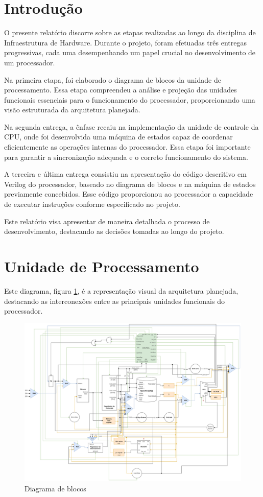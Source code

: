 \section{Introdução}

O presente relatório discorre sobre as etapas realizadas ao longo da disciplina de Infraestrutura de Hardware. Durante o projeto, foram efetuadas três entregas progressivas, cada uma desempenhando um papel crucial no desenvolvimento de um processador.

Na primeira etapa, foi elaborado o diagrama de blocos da unidade de processamento. Essa etapa compreendeu a análise e projeção das unidades funcionais essenciais para o funcionamento do processador, proporcionando uma visão estruturada da arquitetura planejada.

Na segunda entrega, a ênfase recaiu na implementação da unidade de controle da CPU, onde foi desenvolvida uma máquina de estados capaz de coordenar eficientemente as operações internas do processador. Essa etapa foi importante para garantir a sincronização adequada e o correto funcionamento do sistema.

A terceira e última entrega consistiu na apresentação do código descritivo em Verilog do processador, baseado no diagrama de blocos e na máquina de estados previamente concebidos. Esse código proporcionou ao processador a capacidade de executar instruções conforme especificado no projeto.

Este relatório visa apresentar de maneira detalhada o processo de desenvolvimento, destacando as decisões tomadas ao longo do projeto.

\newpage

\section{Unidade de Processamento}

Este diagrama, figura \ref{fig:diagrama_blocos}, é a representação visual da arquitetura planejada, destacando as interconexões entre as principais unidades funcionais do processador.

\begin{figure}[htbp!]
\centering
\includegraphics[width=1\textwidth]{figure/diagrama_bloco.png}
\caption{Diagrama de blocos} 
\label{fig:diagrama_blocos}
\end{figure}

